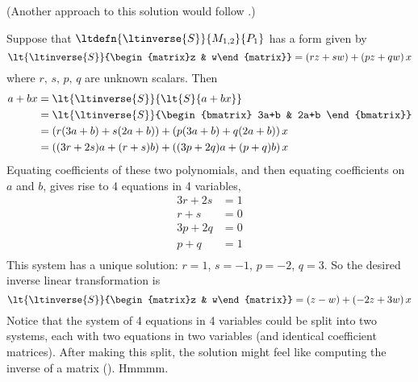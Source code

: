 (Another approach to this solution would follow .)\par
%
Suppose that $\ltdefn{\ltinverse{S}}{M_{1,2}}{P_1}$ has a form given by
%
\begin{equation*}
\lt{\ltinverse{S}}{\begin{matrix}z & w\end{matrix}}=\left(rz+sw\right)+\left(pz+qw\right)x
\end{equation*}
%
where $r,\,s,\,p,\,q$ are unknown scalars.  Then 
%
\begin{align*}
a+bx
&=\lt{\ltinverse{S}}{\lt{S}{a+bx}}\\
&=\lt{\ltinverse{S}}{\begin{bmatrix} 3a+b & 2a+b \end{bmatrix}}\\
&=\left(r(3a+b)+s(2a+b)\right)+\left(p(3a+b)+q(2a+b)\right)x\\
&=\left((3r+2s)a+(r+s)b\right)+\left((3p+2q)a+(p+q)b\right)x
\end{align*}
%
Equating coefficients of these two polynomials, and then equating coefficients on $a$ and $b$, gives rise to 4 equations in 4 variables,
%
\begin{align*}
3r+2s&=1\\
r+s&=0\\
3p+2q&=0\\
p+q&=1\\
\end{align*}
%
This system has a unique solution: $r=1$, $s=-1$, $p=-2$, $q=3$.  So the desired inverse linear transformation is
%
\begin{equation*}
\lt{\ltinverse{S}}{\begin{matrix}z & w\end{matrix}}=\left(z-w\right)+\left(-2z+3w\right)x
\end{equation*}
%
Notice that the system of 4 equations in 4 variables could be split into two systems, each with two equations in two variables (and identical coefficient matrices).  After making this split, the solution might feel like computing the inverse of a matrix ().   Hmmmm.
